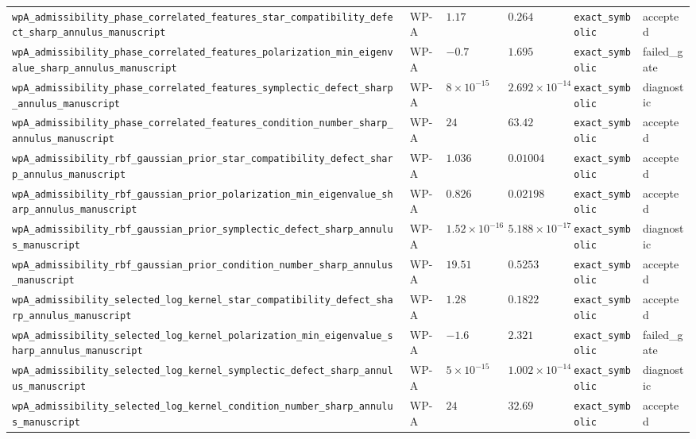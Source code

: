 \begin{table}[t]
\begin{tabular}{@{}llllll@{}}
\texttt{wpA\_admissibility\_phase\_correlated\_features\_star\_compatibility\_defect\_sharp\_annulus\_manuscript} & WP-A & $1.17$ & $0.264$ & \texttt{exact\_symbolic} & accepted \\
\texttt{wpA\_admissibility\_phase\_correlated\_features\_polarization\_min\_eigenvalue\_sharp\_annulus\_manuscript} & WP-A & $-0.7$ & $1.695$ & \texttt{exact\_symbolic} & failed\_gate \\
\texttt{wpA\_admissibility\_phase\_correlated\_features\_symplectic\_defect\_sharp\_annulus\_manuscript} & WP-A & $8\times10^{-15}$ & $2.692\times10^{-14}$ & \texttt{exact\_symbolic} & diagnostic \\
\texttt{wpA\_admissibility\_phase\_correlated\_features\_condition\_number\_sharp\_annulus\_manuscript} & WP-A & $24$ & $63.42$ & \texttt{exact\_symbolic} & accepted \\
\texttt{wpA\_admissibility\_rbf\_gaussian\_prior\_star\_compatibility\_defect\_sharp\_annulus\_manuscript} & WP-A & $1.036$ & $0.01004$ & \texttt{exact\_symbolic} & accepted \\
\texttt{wpA\_admissibility\_rbf\_gaussian\_prior\_polarization\_min\_eigenvalue\_sharp\_annulus\_manuscript} & WP-A & $0.826$ & $0.02198$ & \texttt{exact\_symbolic} & accepted \\
\texttt{wpA\_admissibility\_rbf\_gaussian\_prior\_symplectic\_defect\_sharp\_annulus\_manuscript} & WP-A & $1.52\times10^{-16}$ & $5.188\times10^{-17}$ & \texttt{exact\_symbolic} & diagnostic \\
\texttt{wpA\_admissibility\_rbf\_gaussian\_prior\_condition\_number\_sharp\_annulus\_manuscript} & WP-A & $19.51$ & $0.5253$ & \texttt{exact\_symbolic} & accepted \\
\texttt{wpA\_admissibility\_selected\_log\_kernel\_star\_compatibility\_defect\_sharp\_annulus\_manuscript} & WP-A & $1.28$ & $0.1822$ & \texttt{exact\_symbolic} & accepted \\
\texttt{wpA\_admissibility\_selected\_log\_kernel\_polarization\_min\_eigenvalue\_sharp\_annulus\_manuscript} & WP-A & $-1.6$ & $2.321$ & \texttt{exact\_symbolic} & failed\_gate \\
\texttt{wpA\_admissibility\_selected\_log\_kernel\_symplectic\_defect\_sharp\_annulus\_manuscript} & WP-A & $5\times10^{-15}$ & $1.002\times10^{-14}$ & \texttt{exact\_symbolic} & diagnostic \\
\texttt{wpA\_admissibility\_selected\_log\_kernel\_condition\_number\_sharp\_annulus\_manuscript} & WP-A & $24$ & $32.69$ & \texttt{exact\_symbolic} & accepted \\

\end{tabular}
\end{table}
